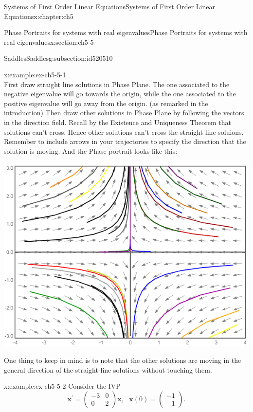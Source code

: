\documentclass[oneside,10pt,]{book}
\numberwithin{equation}{section}
\numberwithin{equation}{section}
\newcommand{\amp}{&}
\begin{document}
\begin{chapterptx}{Systems of First Order Linear Equations}{}{Systems of First Order Linear Equations}{}{}{x:chapter:ch5}
\begin{sectionptx}{Phase Portraits for systems with real eigenvalues}{}{Phase Portraits for systems with real eigenvalues}{}{}{x:section:ch5-5}
\begin{subsectionptx}{Saddles}{}{Saddles}{}{}{g:subsection:id520510}
\begin{example}{}{x:example:ex-ch5-5-1}
\begin{equation*}
\end{equation*}
First draw straight line solutions in Phase Plane. The one associated to the negative eigenvalue will go towards the origin, while the one associated to the positive eigenvalue will go away from the origin. (as remarked in the introduction) Then draw other solutions in Phase Plane by following the vectors in the direction field. Recall by the Existence and Uniqueness Theorem that solutions can't cross. Hence other solutions can't cross the straight line soluions. Remember to include arrows in your trajectories to specify the direction that the solution is moving. And the Phase portrait looks like this: \begin{image}{0}{1}{0}%
\includegraphics[width=\linewidth]{images/7.5b-1.png}
\end{image}%
%
\par
One thing to keep in mind is to note that the other solutions are moving in the general direction of the straight-line solutions without touching them.%
\end{example}
\begin{example}{}{x:example:ex-ch5-5-2}%
Consider the IVP%
\begin{equation*}
\mathbf{x}^{\prime}=\left(\begin{array}{cc}
-3 \amp 0\\
0 \amp 2
\end{array}\right)\mathbf{x},\,\,\,\,\mathbf{x}(0)=\left(\begin{array}{c}
-1\\
-1
\end{array}\right).
\end{equation*}

\end{example}
\end{subsectionptx}
\end{sectionptx}
\end{chapterptx}
\end{document}
